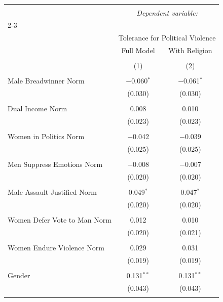 
\begin{table}[!htbp] \centering 
  \caption{} 
  \label{} 
\begin{tabular}{@{\extracolsep{5pt}}lcc} 
\\[-1.8ex]\hline 
\hline \\[-1.8ex] 
 & \multicolumn{2}{c}{\textit{Dependent variable:}} \\ 
\cline{2-3} 
\\[-1.8ex] & \multicolumn{2}{c}{Tolerance for Political Violence} \\ 
 & Full Model & With Religion \\ 
\\[-1.8ex] & (1) & (2)\\ 
\hline \\[-1.8ex] 
 Male Breadwinner Norm & $-$0.060$^{*}$ & $-$0.061$^{*}$ \\ 
  & (0.030) & (0.030) \\ 
  & & \\ 
 Dual Income Norm & 0.008 & 0.010 \\ 
  & (0.023) & (0.023) \\ 
  & & \\ 
 Women in Politics Norm & $-$0.042 & $-$0.039 \\ 
  & (0.025) & (0.025) \\ 
  & & \\ 
 Men Suppress Emotions Norm & $-$0.008 & $-$0.007 \\ 
  & (0.020) & (0.020) \\ 
  & & \\ 
 Male Assault Justified Norm & 0.049$^{*}$ & 0.047$^{*}$ \\ 
  & (0.020) & (0.020) \\ 
  & & \\ 
 Women Defer Vote to Man Norm & 0.012 & 0.010 \\ 
  & (0.020) & (0.021) \\ 
  & & \\ 
 Women Endure Violence Norm & 0.029 & 0.031 \\ 
  & (0.019) & (0.019) \\ 
  & & \\ 
 Gender & 0.131$^{**}$ & 0.131$^{**}$ \\ 
  & (0.043) & (0.043) \\ 
  & & \\ 

\end{tabular}
\end{table}
